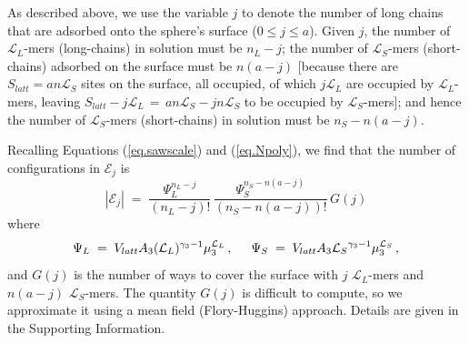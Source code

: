 \documentclass[journal=mamobx,manuscript=article]{achemso}
\newcommand{\leng}{\mathcal{L}}
\begin{document}
 As described above, we use the variable $j$ to 
 denote the number of long chains that are adsorbed
 onto the sphere's surface ($0\leq j\leq a$).
 Given $j$, the number of $\leng_L$-mers (long-chains) in solution must be $n_L-j$; 
 the number of $\leng_S$-mers (short-chains) adsorbed on the surface must be $n(a-j)$ [because there are $S_{latt}=an\leng_S$ sites on the surface, all occupied, of which $j\leng_L$ are occupied by $\leng_L$-mers, leaving $S_{latt}-j\leng_L\,=\, an\leng_S-jn\leng_S$ to be  occupied by $\leng_S$-mers]; 
 and hence the number of $\leng_S$-mers (short-chains) in solution must be  $n_S-n(a-j)$.

Recalling Equations (\ref{eq.sawscale}) and 
(\ref{eq.Npoly}), we find that the number of configurations in $\mathcal{E}_j$ is
\begin{equation}
    |\mathcal{E}_j|  
      \; = \; \frac{ \Psi_L^{n_L-j} }{(n_L-j)!} \,
          \frac{ \Psi_S^{n_S-n(a-j)} }{(n_S-n(a-j))!} \,  G(j)
        \label{eq.Yj}
\end{equation}
where 
\begin{equation}
    \label{eq.psidef}   
   \Psi_L\;=\;V_{latt} A_3 (\leng_L)^{\gamma_3-1} \mu_{3}^{\leng_L} \,,  
    \hspace{5mm} %
     \Psi_S \;=\; V_{latt}A_3{\leng_S}^{\gamma_3-1}\mu_3^{\leng_S} \,,
\end{equation}
and $G(j)$ is the number of ways to cover the surface
with $j$ $\leng_L$-mers and $n(a-j)$ $\leng_S$-mers.
The quantity $G(j)$ is difficult to compute, so we
approximate it using a mean field (Flory-Huggins) approach.  Details are given in the Supporting Information.
\end{document}
